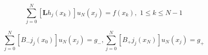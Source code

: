\[
	\sum_{ j=0 }^{ N } \left[ \mathbf{ L } h_{ j }(x_{ k }) \right] u_{ N }\left( x_{ j } \right) = f\left( x_{ k } \right), \hspace{4pt} 1 \leq k \leq N-1
\]

\begin{equation}
	\sum_{ j=0 }^{ N } \left[ B_{ - }j_{ j }\left( x_{ 0 } \right) \right] u_{ N } \left( x_{ j } \right) = g_{ - }, \sum_{ j=0 }^{ N } \left[ B_{ + } j_{ j } \left( x_{ N } \right) \right] u_{ N } (x_{ j }) = g_{ + }
\end{equation}
